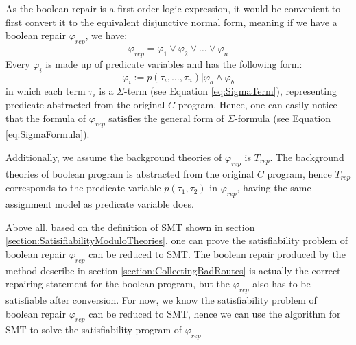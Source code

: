 As the boolean repair is a first-order logic expression, it would be convenient to first convert it to the equivalent disjunctive normal form, meaning if we have a boolean repair $\varphi _{rep}$, we have:
\begin{equation}
\varphi _{rep} = \varphi _{1} \vee \varphi _{2} \vee \dots \vee \varphi _{n}
\end{equation}
Every $\varphi _{i}$ is made up of predicate variables and has the following form:
\begin{equation}
\varphi _{i} := p(\tau _{i},\dots,\tau _{n}) | \varphi _{a} \wedge \varphi _{b}
\end{equation}
in which each term $\tau _{i}$ is a $\Sigma$-term (see Equation \ref{eq:SigmaTerm}), representing predicate abstracted from the original $C$ program.
Hence, one can easily notice that the formula of $\varphi _{rep}$ satisfies the general form of $\Sigma$-formula (see Equation \ref{eq:SigmaFormula}).

Additionally, we assume the background theories of $\varphi _{rep}$ is $T_{rep}$.
The background theories of boolean program is abstracted from the original $C$ program, hence $T_{rep}$ corresponds to the predicate variable $p(\tau _{1}, \tau _{2})$ in $\varphi _{rep}$, having the same assignment model as predicate variable does.

Above all, based on the definition of SMT shown in section \ref{section:SatisifiabilityModuloTheories}, one can prove the satisfiability problem of boolean repair $\varphi _{rep}$ can be reduced to SMT.
The boolean repair produced by the method describe in section \ref{section:CollectingBadRoutes} is actually the correct repairing statement for the boolean program, but the $\varphi _{rep}$ also has to be satisfiable after conversion.
For now, we know the satisfiability problem of boolean repair $\varphi _{rep}$ can be reduced to SMT, hence we can use the algorithm for SMT to solve the satisfiability program of $\varphi _{rep}$

